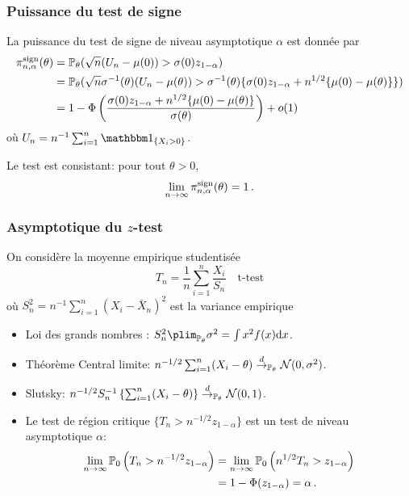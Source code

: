 \begin{frame}
\frametitle{Puissance du test de signe}
La puissance du test de signe de niveau asymptotique $\alpha$ est donnée par
\begin{align*}
\pi^{\mathrm{sign}}_{n,\alpha}(\theta)
&= \operatorname{{\mathbb P}}_\theta( \sqrt{n}(U_n - \mu(0)) > \sigma(0) z_{1-\alpha}) \\
&= \operatorname{{\mathbb P}}_\theta( \sqrt{n} \sigma^{-1}(\theta) (U_n - \mu(\theta)) > \sigma^{-1}(\theta) \{ \sigma(0) z_{1-\alpha} + n^{1/2} \{\mu(0)-\mu(\theta)\}\}) \\
&= 1 - \Phi\left( \frac{\sigma(0) z_{1-\alpha} + n^{1/2} \{ \mu(0) - \mu(\theta)\}}{\sigma(\theta)} \right) + o(1)
\end{align*}
où $U_n= n^{-1} \sum_{i=1}^n \indi{X_i > 0}$.

Le test est \alert{consistant}: pour tout $\theta > 0$,
\alert{
\[
\lim_{n \to \infty}  \pi^{\mathrm{sign}}_{n,\alpha}(\theta) = 1 \,.
\]
}
\end{frame}



\begin{frame}
\frametitle{Asymptotique du $z$-test}
On considère la moyenne empirique \alert{studentisée}
\begin{equation*}
T_n= \frac{1}{n} \sum_{i=1}^n \frac{X_i}{S_n} \quad \text{t-test}
\end{equation*}
où $S^2_n= n^{-1} \sum_{i=1}^n (X_i - \bar{X}_n)^2$ est la \alert{variance empirique}
\begin{itemize}
\item Loi des grands nombres : $S^2_n \plim_{\PP_{\theta}} \sigma^2 = \int x^2 f(x) \rmd x$.
\item Théorème Central limite: $n^{-1/2} \sum_{i=1}^n (X_i - \theta) \stackrel{d}{\rightarrow}_{\operatorname{{\mathbb P}}_\theta} \mathcal{N}(0,\sigma^2)$.
\item Slutsky: $n^{-1/2} S_n^{-1} \left\{ \sum_{i=1}^n (X_i-\theta)  \right\} \stackrel{d}{\rightarrow}_{\operatorname{{\mathbb P}}_\theta} \mathcal{N}(0,1)$.
\item Le test de région critique $\{ T_n > n^{-1/2} z_{1-\alpha} \}$ est un test de niveau asymptotique $\alpha$:
\begin{align*}
\lim_{n \to \infty} \operatorname{{\mathbb P}}_0 \left( T_n > n^{-1/2} z_{1-\alpha} \right)
&= \lim_{n \to \infty} \operatorname{{\mathbb P}}_0 \left( n^{1/2} T_n > z_{1-\alpha} \right) \\
&= 1 - \Phi(z_{1-\alpha})= \alpha \,.
\end{align*}
\end{itemize}
\end{frame}


